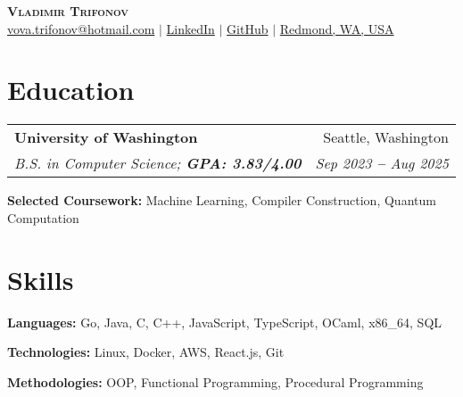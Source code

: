 \documentclass[letterpaper,11pt]{article}
\makeatletter
\newcommand{\resumeEducationHeading}[4]{
  \vspace{-2pt}\item
    \begin{tabular*}{0.97\textwidth}[t]{l@{\extracolsep{\fill}}r}
      \textbf{#1} & #2 \\
      \textit{\small#3} & \textit{\small #4} \\
    \end{tabular*}\vspace{-5pt}
}
\newcommand{\resumeSubHeadingListStart}{\begin{itemize}[leftmargin=0.15in, label={}]}
\newcommand{\resumeSubHeadingListEnd}{\end{itemize}}
\makeatother
\begin{document}

\begin{center}
    \textbf{\Huge \scshape Vladimir Trifonov} \\ \vspace{3pt}
    \small
    \faEnvelope \hspace{.5pt} \href{mailto:vova.trifonov@hotmail.com}{\color{blue}vova.trifonov@hotmail.com}
    $|$
    \faLinkedinSquare \hspace{.5pt} \href{https://www.linkedin.com/in/vladimir-trifonov-a06284220/}{\color{blue}LinkedIn}
    $|$
    \faGithub \hspace{.5pt} \href{https://github.com/Vladimirtrif}{\color{blue}GitHub}
    $|$
    \faMapMarker \hspace{.5pt} \href{https://maps.app.goo.gl/JGq95Uiw7m12e89E8}{\color{blue}Redmond, WA, USA}
\end{center}




\section{Education}
  \vspace{3pt}
  \resumeSubHeadingListStart
    
    \resumeEducationHeading
      {University of Washington} {Seattle, Washington}
      {B.S. in Computer Science;   \textbf{GPA: 3.83/4.00}} {Sep 2023 \textbf{--} Aug 2025}
        \resumeSubHeadingListStart
        \small{\item{
             \textbf{Selected Coursework:} Machine Learning, Compiler Construction, Quantum Computation
             }}
        \resumeSubHeadingListEnd
  \resumeSubHeadingListEnd




\section{Skills}
  \vspace{2pt}
  \resumeSubHeadingListStart
    \small{\item{
        
        \textbf{Languages:}{ Go, Java, C, C++, JavaScript, TypeScript, OCaml, x86\_64, SQL} \\ \vspace{3pt}
        
        \textbf{Technologies:}{ Linux, Docker, AWS, React.js, Git} \\ \vspace{3pt}
        
        \textbf{Methodologies:}{ OOP, Functional Programming, Procedural Programming} \\ \vspace{3pt}
        
    }}
  \resumeSubHeadingListEnd
\end{document}
